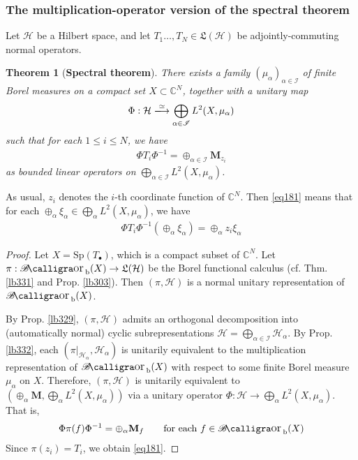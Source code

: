 \documentclass[12pt,b5paper,notitlepage]{article}
\theoremstyle{definition}
\theoremstyle{plain}
\newtheorem{thm}[df]{Theorem}
\DeclareMathOperator{\Borb}{{\mathscr{B}\text{\kern -2pt {\calligra\large or}}\,}_{\mathrm b}}
\newcommand{\fk}{\mathfrak}
\newcommand{\blt}{\bullet}
\newcommand{\Cbb}{\mathbb C}
\newcommand{\Sp}{\mathrm{Sp}}
\newcommand{\MH}{\mathcal H}
\newcommand{\SI}{\mathscr I}
\newcommand{\Mbf}{\mathbf M}
\numberwithin{equation}{section}
\begin{document}
\subsubsection{The multiplication-operator version of the spectral theorem}

Let $\MH$ be a Hilbert space, and let $T_1\dots,T_N\in\fk L(\MH)$ be adjointly-commuting normal operators.


\begin{thm}[\textbf{Spectral theorem}]\label{lb330}
There exists a family $(\mu_\alpha)_{\alpha\in \SI}$ of finite Borel measures on a compact set $X\subset\Cbb^N$, together with a unitary map
\begin{gather*}
\Phi: \MH\xlongrightarrow{\simeq}\bigoplus_{\alpha\in\SI} L^2(X,\mu_\alpha)
\end{gather*}
such that for each $1\leq i\leq N$, we have
\begin{align}\label{eq181}
\Phi T_i\Phi^{-1}=\oplus_{\alpha\in\SI}\Mbf_{z_i}
\end{align}
as bounded linear operators on $\bigoplus_{\alpha\in\SI} L^2(X,\mu_\alpha)$.
\end{thm}

As usual, $z_i$ denotes the $i$-th coordinate function of $\Cbb^N$. Then \eqref{eq181} means that for each $\oplus_\alpha\xi_\alpha\in\bigoplus_\alpha L^2(X,\mu_\alpha)$, we have
\begin{align*}
\Phi T_i\Phi^{-1}(\oplus_\alpha\xi_\alpha)=\oplus_\alpha z_i\xi_\alpha
\end{align*}


\begin{proof}
Let $X=\Sp(T_\blt)$, which is a compact subset of $\Cbb^N$. Let $\pi:\Borb(X)\rightarrow\fk L(\MH)$ be the Borel functional calculus (cf. Thm. \ref{lb331} and Prop. \ref{lb303}). Then $(\pi,\MH)$ is a normal unitary representation of $\Borb(X)$. 

By Prop. \ref{lb329}, $(\pi,\MH)$ admits an orthogonal decomposition into (automatically normal) cyclic subrepresentations $\MH=\bigoplus_{\alpha\in\SI}\MH_\alpha$. By Prop. \ref{lb332}, each $(\pi|_{\MH_\alpha},\MH_\alpha)$ is unitarily equivalent to the multiplication representation of $\Borb(X)$ with respect to some finite Borel measure $\mu_\alpha$ on $X$. Therefore, $(\pi,\MH)$ is unitarily equivalent to $(\oplus_\alpha \Mbf,\bigoplus_\alpha L^2(X,\mu_\alpha))$ via a unitary operator $\Phi:\MH\rightarrow \bigoplus_\alpha L^2(X,\mu_\alpha)$. That is,
\begin{align*}
\Phi\pi(f)\Phi^{-1}=\oplus_\alpha \Mbf_f\qquad\text{for each }f\in\Borb(X)
\end{align*}
Since $\pi(z_i)=T_i$, we obtain \eqref{eq181}.
\end{proof}
\end{document}
